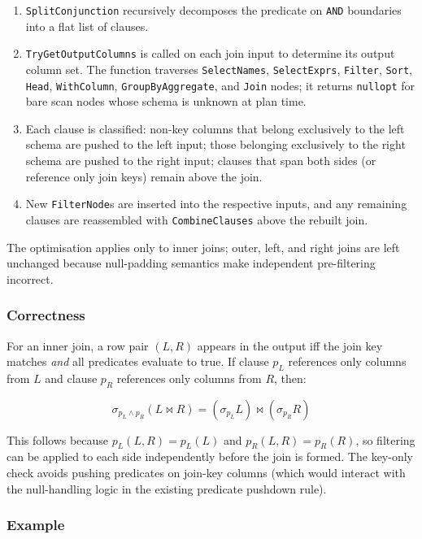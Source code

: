 \documentclass[12pt,a4paper]{article}
\begin{document}
\begin{enumerate}[leftmargin=1.5em]
  \item \texttt{SplitConjunction} recursively decomposes the predicate on
        \texttt{AND} boundaries into a flat list of clauses.
  \item \texttt{TryGetOutputColumns} is called on each join input to
        determine its output column set.  The function traverses
        \texttt{SelectNames}, \texttt{SelectExprs}, \texttt{Filter},
        \texttt{Sort}, \texttt{Head}, \texttt{WithColumn},
        \texttt{GroupByAggregate}, and \texttt{Join} nodes; it returns
        \texttt{nullopt} for bare scan nodes whose schema is unknown at
        plan time.
  \item Each clause is classified: non-key columns that belong exclusively
        to the left schema are pushed to the left input; those belonging
        exclusively to the right schema are pushed to the right input;
        clauses that span both sides (or reference only join keys) remain
        above the join.
  \item New \texttt{FilterNode}s are inserted into the respective inputs,
        and any remaining clauses are reassembled with
        \texttt{CombineClauses} above the rebuilt join.
\end{enumerate}

The optimisation applies only to inner joins; outer, left, and right joins
are left unchanged because null-padding semantics make independent
pre-filtering incorrect.

\subsubsection*{Correctness}

For an inner join, a row pair $(L, R)$ appears in the output iff the join
key matches \emph{and} all predicates evaluate to true.  If clause $p_L$
references only columns from $L$ and clause $p_R$ references only columns
from $R$, then:

\[
\sigma_{p_L \wedge p_R}(L \bowtie R) = (\sigma_{p_L} L) \bowtie (\sigma_{p_R} R)
\]

This follows because $p_L(L, R) = p_L(L)$ and $p_R(L, R) = p_R(R)$, so
filtering can be applied to each side independently before the join is
formed.  The key-only check avoids pushing predicates on join-key columns
(which would interact with the null-handling logic in the existing predicate
pushdown rule).

\subsubsection*{Example}
\end{document}
